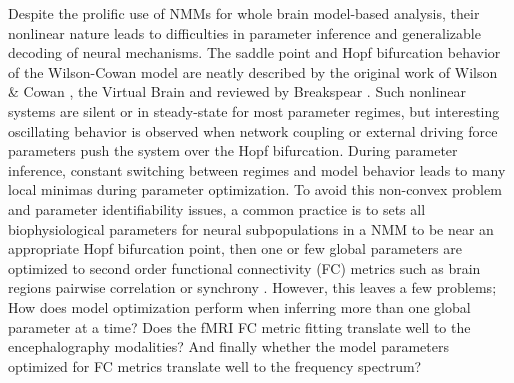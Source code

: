 Despite the prolific use of NMMs for whole brain model-based analysis, their nonlinear nature leads to difficulties in parameter inference and generalizable decoding of neural mechanisms. The saddle point and Hopf bifurcation behavior of the Wilson-Cowan model are neatly described by the original work of Wilson \& Cowan \cite{Wilson1972}, the Virtual Brain \cite{sanz-leon_mathematical_2015} and reviewed by Breakspear \cite{breakspear_dynamic_2017}. Such nonlinear systems are silent or in steady-state for most parameter regimes, but interesting oscillating behavior is observed when network coupling or external driving force parameters push the system over the Hopf bifurcation. During parameter inference, constant switching between regimes and model behavior leads to many local minimas during parameter optimization. To avoid this non-convex problem and parameter identifiability issues, a common practice is to sets all biophysiological parameters for neural subpopulations in a NMM to be near an appropriate Hopf bifurcation point, then one or few global parameters are optimized to second order functional connectivity (FC) metrics such as brain regions pairwise correlation or synchrony \cite{Zimmermann2018, Deco2009, abeysuriya_biophysical_2018, wang_inversion_2019, demirtas_hierarchical_2019, honey_predicting_2009}. However, this leaves a few problems; How does model optimization perform when inferring more than one global parameter at a time? Does the fMRI FC metric fitting translate well to the encephalography modalities? And finally whether the model parameters optimized for FC metrics translate well to the frequency spectrum?


